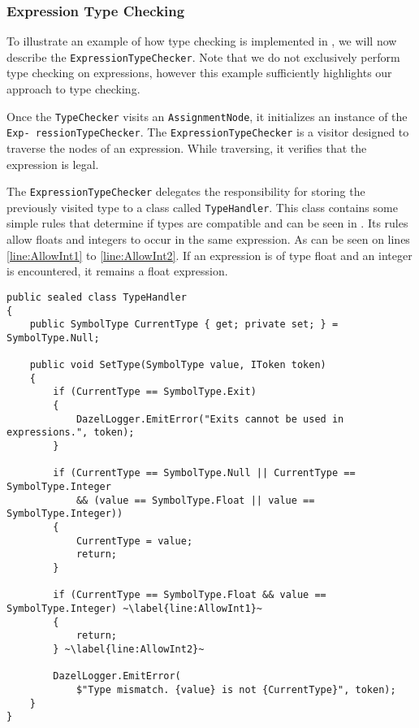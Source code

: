 \subsubsection*{Expression Type Checking} \label{sec:ExpressionTypeChecking}
To illustrate an example of how type checking is implemented in \dazel{}, we will now describe the \texttt{ExpressionTypeChecker}.
Note that we do not exclusively perform type checking on expressions, however this example sufficiently highlights our approach to type checking.


Once the \texttt{TypeChecker} visits an \texttt{AssignmentNode}, it initializes an instance of the \texttt{Exp-
ressionTypeChecker}. The \texttt{ExpressionTypeChecker} is a visitor designed to traverse the nodes of an expression. While traversing, it verifies that the expression is legal.

The \texttt{ExpressionTypeChecker} delegates the responsibility for storing the previously visited type to a class called \texttt{TypeHandler}. This class contains some simple rules that determine if types are compatible and can be seen in . 
Its rules allow floats and integers to occur in the same expression. As can be seen on lines \ref{line:AllowInt1} to \ref{line:AllowInt2}. If an expression is of type float and an integer is encountered, it remains a float expression.

\begin{lstlisting}[language=CSharp, caption={The \texttt{TypeHandler} class.}, label={lst:TypeHandler},escapechar=~]
public sealed class TypeHandler
{
    public SymbolType CurrentType { get; private set; } = SymbolType.Null;

    public void SetType(SymbolType value, IToken token)
    {
        if (CurrentType == SymbolType.Exit)
        {
            DazelLogger.EmitError("Exits cannot be used in expressions.", token);
        }
            
        if (CurrentType == SymbolType.Null || CurrentType == SymbolType.Integer 
            && (value == SymbolType.Float || value == SymbolType.Integer))
        {
            CurrentType = value;
            return;
        }
            
        if (CurrentType == SymbolType.Float && value == SymbolType.Integer) ~\label{line:AllowInt1}~
        {
            return;
        } ~\label{line:AllowInt2}~
            
        DazelLogger.EmitError(
            $"Type mismatch. {value} is not {CurrentType}", token);
    }
}
\end{lstlisting}

